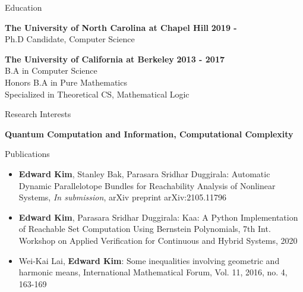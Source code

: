 \documentclass{resume} %
\begin{document}

\begin{rSection}{Education}

{\bf The University of North Carolina at Chapel Hill} \hfill{\bf 2019 -} \\
Ph.D Candidate, Computer Science

{\bf The University of California at Berkeley} \hfill {\bf 2013 - 2017} \\
B.A in Computer Science \\
Honors B.A in Pure Mathematics \\
{\small Specialized in Theoretical CS, Mathematical Logic}
\end{rSection}

\begin{rSection}{Research Interests}

{\bf Quantum Computation and Information, Computational Complexity}

\end{rSection}

\begin{rSection}{Publications}
  \begin{itemize}
    \item {\bf Edward Kim}, Stanley Bak, Parasara Sridhar Duggirala: Automatic Dynamic Parallelotope Bundles for Reachability Analysis of Nonlinear Systems, \emph{In submission}, arXiv preprint arXiv:2105.11796
    \item {\bf Edward Kim}, Parasara Sridhar Duggirala: Kaa: A Python Implementation of Reachable Set Computation Using Bernstein Polynomials, 7th Int. Workshop on Applied Verification for Continuous and Hybrid Systems, 2020
    \item Wei-Kai Lai, {\bf Edward Kim}:  Some inequalities involving geometric and harmonic means, International Mathematical Forum, Vol. 11, 2016, no. 4, 163-169
  \end{itemize}
\end{rSection}
\end{document}
